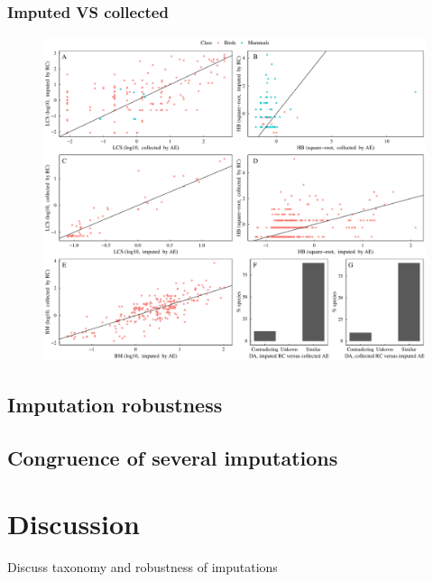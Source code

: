 \subsubsection{Imputed VS collected}
\begin{figure}[h!]
\centering
\includegraphics[scale=0.5]{figures/chapter2/Comparison_with_RCooke/Comparison_imputed_VS_collected.pdf}
\caption[]{}
\label{ComparisonRC_VS}
\end{figure}


\subsection{Imputation robustness}

\subsection{Congruence of several imputations}


\section{Discussion}
Discuss taxonomy and robustness of imputations

